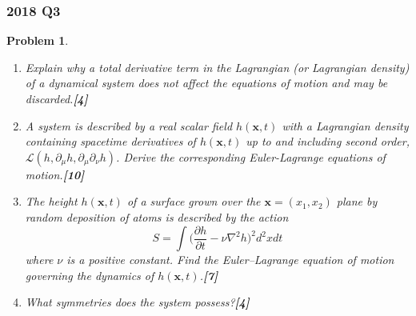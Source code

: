 \documentclass[a4paper]{article}
\theoremstyle{new}
\newtheorem{qns}{Problem}[section]
\begin{document}
\subsubsection*{2018 Q3}
\begin{qns}\leavevmode
\begin{enumerate}[label=(\alph*)]
\item Explain why a total derivative term in the Lagrangian (or Lagrangian density) of a dynamical system does not affect the equations of motion and may be discarded.\hfill\textbf{[4]}
\item A system is described by a real scalar field $h(\mathbf{x}, t)$ with a Lagrangian density containing spacetime derivatives of $h(\mathbf{x}, t)$ up to and including second order, $\mathcal{L}(h, \partial_\mu h, \partial_\mu\partial_\nu h)$. Derive the corresponding Euler-Lagrange equations of motion.\hfill\textbf{[10]}
\item The height $h(\mathbf{x}, t)$ of a surface grown over the $\mathbf{x} = (x_1, x_2)$ plane by random deposition of atoms is described by the action
$$S=\int\bigg(\frac{\partial h}{\partial t}-\nu\nabla^2h\bigg)^2d^2xdt$$
where $\nu$ is a positive constant. Find the Euler–Lagrange equation of motion governing the dynamics of $h(\mathbf{x},t)$.\hfill\textbf{[7]}
\item  What symmetries does the system possess?\hfill\textbf{[4]}
\end{enumerate}
\end{qns}
\newpage
\end{document}
